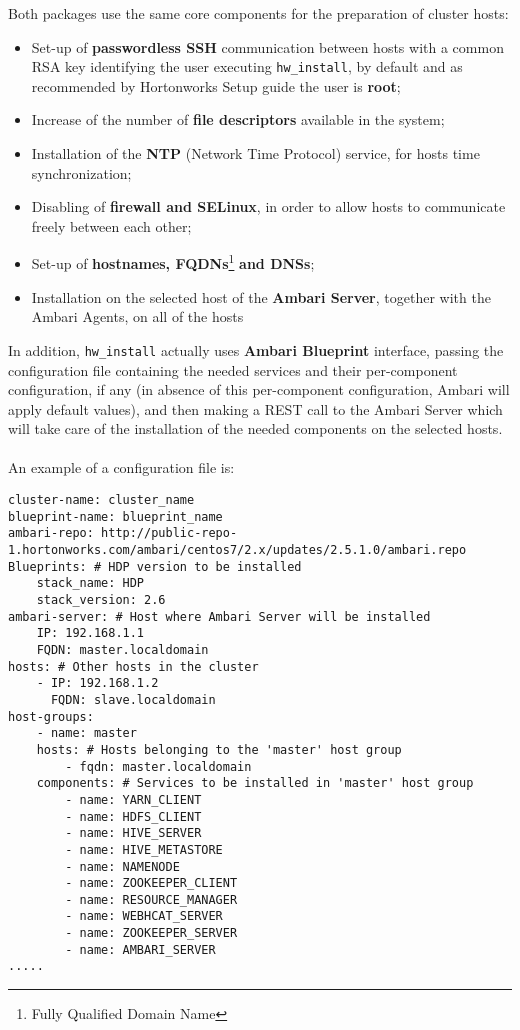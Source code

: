 Both packages use the same core components for the preparation of cluster hosts:

\begin{itemize}
    \item Set-up of \textbf{passwordless SSH} communication between hosts with a common RSA key identifying the user executing \texttt{hw\_install}, by default and as recommended by Hortonworks Setup guide the user is \textbf{root};
    \item Increase of the number of \textbf{file descriptors} available in the system;
    \item Installation of the \textbf{NTP} (Network Time Protocol) service, for hosts time synchronization;
    \item Disabling of \textbf{firewall and SELinux}, in order to allow hosts to communicate freely between each other;
    \item Set-up of \textbf{hostnames, FQDNs}\footnote{Fully Qualified Domain Name} \textbf{and DNSs};
    \item Installation on the selected host of the \textbf{Ambari Server}, together with the Ambari Agents, on all of the hosts
\end{itemize}

In addition, \texttt{hw\_install} actually uses \textbf{Ambari Blueprint} interface, passing the configuration file containing the needed services and their per-component configuration, if any (in absence of this per-component configuration, Ambari will apply default values), and then making a REST call to the Ambari Server which will take care of the installation of the needed components on the selected hosts.
\\\\
An example of a configuration file is:

\begin{verbatim}
cluster-name: cluster_name
blueprint-name: blueprint_name
ambari-repo: http://public-repo-1.hortonworks.com/ambari/centos7/2.x/updates/2.5.1.0/ambari.repo
Blueprints: # HDP version to be installed
    stack_name: HDP
    stack_version: 2.6
ambari-server: # Host where Ambari Server will be installed
    IP: 192.168.1.1
    FQDN: master.localdomain
hosts: # Other hosts in the cluster
    - IP: 192.168.1.2
      FQDN: slave.localdomain
host-groups:
    - name: master
    hosts: # Hosts belonging to the 'master' host group
        - fqdn: master.localdomain
    components: # Services to be installed in 'master' host group
        - name: YARN_CLIENT
        - name: HDFS_CLIENT
        - name: HIVE_SERVER
        - name: HIVE_METASTORE
        - name: NAMENODE
        - name: ZOOKEEPER_CLIENT
        - name: RESOURCE_MANAGER
        - name: WEBHCAT_SERVER
        - name: ZOOKEEPER_SERVER
        - name: AMBARI_SERVER
.....
\end{verbatim}

